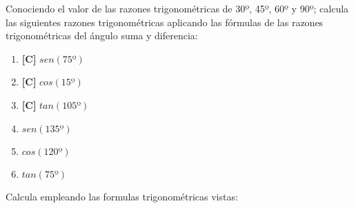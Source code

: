 \Exercicio Conociendo el valor de las razones trigonométricas de 30º, 45º, 60º y 90º; calcula las siguientes razones trigonométricas aplicando las fórmulas de las razones trigonométricas del ángulo suma y diferencia:

\begin{enumerate}[topsep=0pt]
	\item \textbf{[C]} $sen(75º)$
	\item \textbf{[C]} $cos(15º)$
	\item \textbf{[C]} $tan(105º)$
	
	\item $sen(135º)$
	\item $cos(120º)$
	\item $tan(75º)$
\end{enumerate}


\Exercicio Calcula empleando las formulas trigonométricas vistas:

